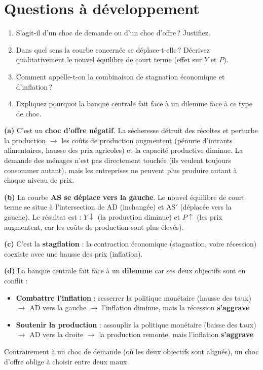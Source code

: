 \section{Questions à développement}

\setcounter{shortcounter}{0}


\begin{enumerate}[label=(\alph*)]
   \item S'agit-il d'un choc de demande ou d'un choc d'offre\,? Justifiez.
   \item Dans quel sens la courbe concernée se déplace-t-elle\,? Décrivez qualitativement le nouvel équilibre de court terme (effet sur $Y$ et $P$).
   \item Comment appelle-t-on la combinaison de stagnation économique et d'inflation\,?
   \item Expliquez pourquoi la banque centrale fait face à un dilemme face à ce type de choc.
\end{enumerate}

\begin{reponse}
\textbf{(a)} C'est un \textbf{choc d'offre négatif}. La sécheresse détruit des récoltes et perturbe la production $\to$ les coûts de production augmentent (pénurie d'intrants alimentaires, hausse des prix agricoles) et la capacité productive diminue. La demande des ménages n'est pas directement touchée (ils veulent toujours consommer autant), mais les entreprises ne peuvent plus produire autant à chaque niveau de prix.

\textbf{(b)} La courbe \textbf{AS se déplace vers la gauche}. Le nouvel équilibre de court terme se situe à l'intersection de AD (inchangée) et AS$'$ (déplacée vers la gauche). Le résultat est : $Y \downarrow$ (la production diminue) et $P \uparrow$ (les prix augmentent, car les coûts de production sont plus élevés).

\textbf{(c)} C'est la \textbf{stagflation} : la contraction économique (stagnation, voire récession) coexiste avec une hausse des prix (inflation).

\textbf{(d)} La banque centrale fait face à un \textbf{dilemme} car ses deux objectifs sont en conflit :
\begin{itemize}
   \item \textbf{Combattre l'inflation} : resserrer la politique monétaire (hausse des taux) $\to$ AD vers la gauche $\to$ l'inflation diminue, mais la récession \textbf{s'aggrave}
   \item \textbf{Soutenir la production} : assouplir la politique monétaire (baisse des taux) $\to$ AD vers la droite $\to$ la production remonte, mais l'inflation \textbf{s'aggrave}
\end{itemize}
Contrairement à un choc de demande (où les deux objectifs sont alignés), un choc d'offre oblige à choisir entre deux maux.
\end{reponse}


